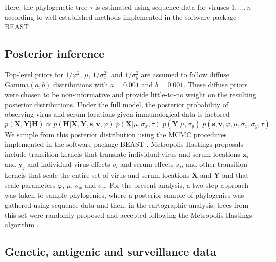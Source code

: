 \documentclass[11pt,oneside,letterpaper]{article}
\newcommand{\virus}{\mathbf{x}}						%
\newcommand{\serum}{\mathbf{y}}						%
\newcommand{\viruses}{\mathbf{X}}					%
\newcommand{\sera}{\mathbf{Y}}						%
\newcommand{\ve}{v}									%
\newcommand{\se}{s}									%
\newcommand{\ves}{\mathbf{v}}						%
\newcommand{\ses}{\mathbf{s}}						%
\newcommand{\mdssd}{\varphi}						%
\newcommand{\virussd}{\sigma_x}						%
\newcommand{\serumsd}{\sigma_y}						%
\newcommand{\drift}{\mu}							%
\newcommand{\tree}{\tau}							%
\newcommand{\vn}{n}									%
\begin{document}
Here, the phylogenetic tree $\tree$ is estimated using sequence data for viruses $1,\ldots,\vn$ according to well established methods implemented in the software package BEAST \cite{BEAST17}.

\subsection*{Posterior inference}

Top-level priors for $1/\mdssd^2$, $\drift$, $1/\virussd^2$, and $1/\serumsd^2$ are assumed to follow diffuse $\mbox{Gamma}(a, b)$ distributions  with $a=0.001$ and $b=0.001$.
These diffuse priors were chosen to be non-informative and provide little-to-no weight on the resulting posterior distributions.
Under the full model, the posterior probability of observing virus and serum locations given immunological data is factored
\begin{equation}
	p(\viruses,\sera | \mathbf{H}) \propto p(\mathbf{H} | \viruses, \sera, \ses, \ves, \mdssd) \; 
	p(\viruses | \drift, \virussd, \tree) \;
	p(\sera | \drift, \serumsd) \; 
	p(\ses, \ves, \mdssd, \drift, \virussd, \serumsd, \tree).
\end{equation}
We sample from this posterior distribution using the MCMC procedures implemented in the software package BEAST \cite{BEAST17}.
Metropolis-Hastings proposals include transition kernels that translate individual virus and serum locations $\virus_i$ and $\serum_j$ and individual virus effects $\ve_i$ and serum effects $\se_j$, and other transition kernels that scale the entire set of virus and serum locations $\viruses$ and $\sera$ and that scale parameters $\mdssd$, $\drift$, $\virussd$ and $\serumsd$.
For the present analysis, a two-step approach was taken to sample phylogenies, where a posterior sample of phylogenies was gathered using sequence data and then, in the cartographic analysis, trees from this set were randomly proposed and accepted following the Metropolis-Hastings algorithm \cite{Pagel04}.

\subsection*{Genetic, antigenic and surveillance data}
\end{document}
